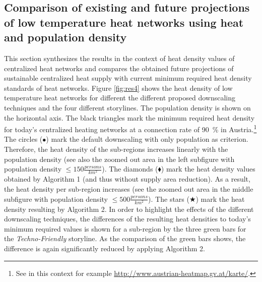 \subsection{Comparison of existing and future projections of low temperature heat networks using heat and population density}\label{res:5}
This section synthesizes the results in the context of heat density values of centralized heat networks and compares the obtained future projections of sustainable centralized heat supply with current minimum required heat density standards of heat networks. Figure \ref{fig:res4} shows the heat density of low temperature heat networks for different the different proposed downscaling techniques and the four different storylines. The population density is shown on the horizontal axis. The black triangles mark the minimum required heat density for today's centralized heating networks at a connection rate of \SI{90}{\%} in Austria.\footnote{See in this context for example \url{http://www.austrian-heatmap.gv.at/karte/}.} The circles ($\bullet$) mark the default downscaling with only population as criterion. Therefore, the heat density of the sub-regions increases linearly with the population density (see also the zoomed out area in the left subfigure with population density $\leq 150 \frac{persons}{km^2}$). The diamonds ($\blacklozenge$) mark the heat density values obtained by Algorithm 1 (and thus without supply area reduction). As a result, the heat density per sub-region increases (see the zoomed out area in the middle subfigure with population density $\leq 500 \frac{persons}{km^2}$). The stars ($\bigstar$) mark the heat density resulting by Algorithm 2. In order to highlight the effects of the different downscaling techniques, the differences of the resulting heat densities to today's minimum required values is shown for a sub-region by the three green bars for the \textit{Techno-Friendly} storyline. As the comparison of the green bars shows, the difference is again significantly reduced by applying Algorithm 2.

